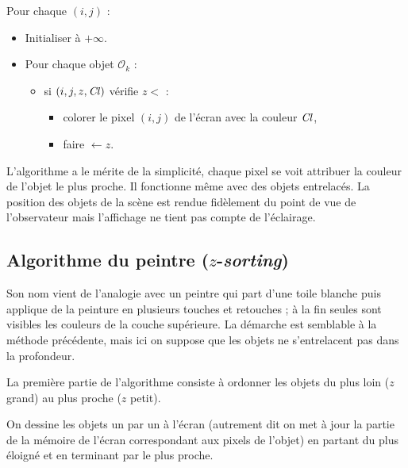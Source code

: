 \documentclass[11pt,class=report,crop=false]{standalone}
\begin{document}
\begin{algorithme}
Pour chaque $(i,j)$ :
\begin{itemize}
	\item Initialiser  à $+\infty$.
	
	\item Pour chaque objet $\mathcal{O}_k$ :
	\begin{itemize}
		\item si $(i,j,z,\operatorname{\it Cl})$ vérifie $z < $  :
		\begin{itemize}
			\item colorer le pixel $(i,j)$ de l'écran avec la couleur $\operatorname{\it Cl}$,
			\item faire  $\leftarrow z$.
		\end{itemize}
	\end{itemize}
\end{itemize}
\end{algorithme}



L'algorithme a le mérite de la simplicité, chaque pixel se voit attribuer la couleur de l'objet le plus proche. Il fonctionne même avec des objets entrelacés.
La position des objets de la scène est rendue fidèlement du point de vue de l'observateur mais l'affichage ne tient pas compte de l'éclairage.



\subsection{Algorithme du peintre ($z$-\emph{sorting})}


Son nom vient de l'analogie avec un peintre qui part d'une toile blanche puis applique de la peinture en plusieurs touches et retouches ; à la fin seules sont visibles les couleurs de la couche supérieure.
La démarche est semblable à la méthode précédente, mais ici on suppose que les objets ne s'entrelacent pas dans la profondeur.


La première partie de l'algorithme consiste à ordonner les objets du plus loin ($z$ grand) au plus proche ($z$ petit).


On dessine les objets un par un à l'écran (autrement dit on met à jour la partie de la mémoire de l'écran correspondant aux pixels de l'objet) en partant du plus éloigné et en terminant par le plus proche.
\end{document}

